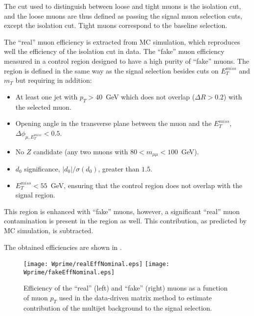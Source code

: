 The cut used to distinguish between loose and tight muons is the isolation cut, and the loose muons
are thus defined as passing the signal muon selection cuts, except the isolation cut. Tight muons correspond
to the baseline selection.

The ``real'' muon efficiency is extracted from MC simulation, which reproduces well the efficiency of the isolation cut in data. The ``fake'' muon efficiency measured in a control region designed to have a high purity of ``fake'' muons. The region is defined in the same way as the signal selection besides cuts on $E_T^{miss}$ and $m_T$ but requiring in addition:
\begin{itemize}
\item At least one jet with $p_T > 40$~GeV which does not overlap ($\Delta R > 0.2$)
with the selected muon.
\item Opening angle in the transverse plane between the muon and the $E_T^{miss}$, $\Delta\phi_{\mu,E_T^{miss}} < 0.5$.
\item No $Z$ candidate (any two muons with $80 < m_{\mu\mu} < 100$~GeV).
\item $d_0$ significance, $|d_0|/\sigma(d_0)$, greater than $1.5$.
\item $E_T^{miss} < 55$~GeV, ensuring that the control region does not overlap with the signal region.
\end{itemize}
This region is enhanced with ``fake'' muons, however, a significant ``real'' muon contamination is present in the region as well. This contribution, as predicted by MC simulation, is subtracted.

The obtained efficiencies are shown in .
\begin{figure}[]
  \centering
  \texttt{[image: Wprime/realEffNominal.eps]}
  \texttt{[image: Wprime/fakeEffNominal.eps]}
  \caption{Efficiency of the ``real'' (left) and ``fake'' (right) muons as a function of muon $p_T$ used in the data-driven matrix method to estimate contribution of the multijet background to the signal selection.}
  \label{fig:matrix_method_efficiencies}
\end{figure}

